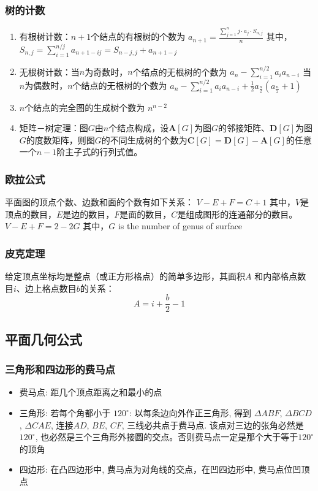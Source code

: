 \documentclass[landscape,a4paper]{article}
\begin{document}
\begin{spacing}{0.3}
\begin{multicols}{2}
\subsubsection{树的计数}

\begin{enumerate}
	\item 有根树计数：$n+1$个结点的有根树的个数为
		$a_{n+1} = \frac{\sum_{j=1}^{n}{j \cdot a_j \cdot{S_{n, j}}}}{n}$
	其中，
		$S_{n, j} = \sum_{i=1}^{n/j}{a_{n+1-ij}} = S_{n-j, j} + a_{n+1-j}$
	\item 无根树计数：当$n$为奇数时，$n$个结点的无根树的个数为
		$a_n-\sum_{i=1}^{n/2}{a_ia_{n-i}}$
	当$n$为偶数时，$n$个结点的无根树的个数为
		$a_n-\sum_{i=1}^{n/2}{a_ia_{n-i}}+\frac{1}{2}a_{\frac{n}{2}}(a_{\frac{n}{2}}+1)$
	\item $n$个结点的完全图的生成树个数为
		$n^{n-2}$
	\item 矩阵－树定理：图$G$由$n$个结点构成，设$\bm{A}[G]$为图$G$的邻接矩阵、$\bm{D}[G]$为图$G$的度数矩阵，则图$G$的不同生成树的个数为$\bm{C}[G] = \bm{D}[G] - \bm{A}[G]$的任意一个$n-1$阶主子式的行列式值。
\end{enumerate}

\subsubsection{欧拉公式}

平面图的顶点个数、边数和面的个数有如下关系：
	$V - E + F = C+ 1$
\indent 其中，$V$是顶点的数目，$E$是边的数目，$F$是面的数目，$C$是组成图形的连通部分的数目。
$V - E + F = 2 - 2G$
\indent 其中，$G$ is the number of genus of surface

\subsubsection{皮克定理}

给定顶点坐标均是整点（或正方形格点）的简单多边形，其面积$A$ 和内部格点数目$i$、边上格点数目$b$的关系：
	$$A = i + \frac{b}{2} - 1$$


\subsection{平面几何公式}
\subsubsection{三角形和四边形的费马点}
  \begin{itemize}
  \item 费马点: 距几个顶点距离之和最小的点
  \item 三角形:
      若每个角都小于 $120^{\circ}$: 以每条边向外作正三角形, 得到 $\Delta ABF$, $\Delta BCD$, $\Delta CAE$, 连接$AD$, $BE$, $CF$, 三线必共点于费马点. 该点对三边的张角必然是$120^{\circ}$, 也必然是三个三角形外接圆的交点。否则费马点一定是那个大于等于$120^{\circ}$的顶角
  \item 四边形:
        在凸四边形中, 费马点为对角线的交点，在凹四边形中, 费马点位凹顶点
\end{itemize}

\end{multicols}
\end{spacing}
\end{document}
